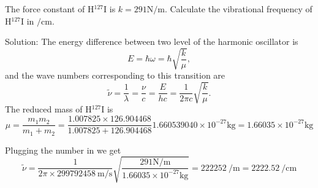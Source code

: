 \documentclass[../Main/chem331-notes.tex]{subfiles}
\begin{document}
\begin{example}
The force constant of H${}^{127}$I is $k = 291 \si{\newton\per\meter}$. Calculate the vibrational frequency of H${}^{127}$I in $\si{\per\centi\meter}$.

Solution: The energy difference between two level of the harmonic oscillator is
\begin{equation}
E = \hbar \omega = \hbar \sqrt{\frac{k}{\mu}},
\end{equation}
and the wave numbers corresponding to this transition are
\begin{equation}
\tilde{\nu} = \frac{1}{\lambda} = \frac{\nu}{c} =  \frac{E}{hc} = \frac{1}{2\pi c}\sqrt{\frac{k}{\mu}}.
\end{equation}
The reduced mass of H${}^{127}$I is
\begin{equation}
\mu = \frac{m_1  m_2}{m_1 + m_2} = \frac{1.007825 \times 126.904468}{1.007825 + 126.904468} 1.660539040 \times 10^{-27} \si{\kilogram} = 1.66035 \times 10^{-27} \si{\kilogram}
\end{equation}

Plugging the number in we get
\begin{equation}
\tilde{\nu} = \frac{1}{2 \pi \times \SI{299792458}{\meter\per\second}}\sqrt{\frac{291 \si{\newton\per\meter}}{1.66035 \times 10^{-27} \si{\kilogram}}} = \SI{222252}{\per\meter} = \SI{2222.52}{\per\centi\meter}
\end{equation}

\end{example}
\end{document}
